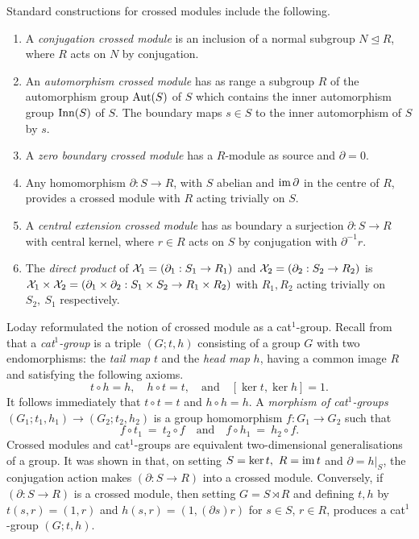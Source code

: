 \documentclass[a4paper,11pt]{article}
\theoremstyle{plain}
\theoremstyle{definition}
\begin{document}
Standard constructions for crossed modules include the following. 
\begin{enumerate}
\item 
A \emph{conjugation crossed module}  
is an inclusion of a normal subgroup $N \unlhd R$, 
where $R$ acts on $N$ by conjugation.
\item 
An \emph{automorphism crossed module}  
has as range a subgroup $R$ of the automorphism group $\mathrm{Aut}(S)$ of $S$ 
which contains the inner automorphism group $\mathrm{Inn}(S)$ of $S$. 
The boundary maps $s \in S$ to the inner automorphism of $S$ by $s$.
\item 
A \emph{zero boundary crossed module}  
has a $R$-module as source and $\partial = 0$.
\item 
Any homomorphism $\partial : S \to R$, with $S$ abelian 
and $\mathrm{im}\,\partial$ in the centre of $R$, 
provides a crossed module with $R$ acting trivially on $S$.
\item 
A \emph{central extension crossed module} 
has as boundary a surjection $\partial : S \to R$ with central kernel, 
where $r \in R$ acts on $S$ by conjugation with $\partial^{-1}r$.
\item 
The \emph{direct product} of  
$\mathcal{X}_1 = (\partial_1 : S_1 \to R_1)$ and $\mathcal{X}_2 = (\partial_2 : S_2 \to R_2)$ 
is $\mathcal{X}_1 \times \mathcal{X}_2 
= (\partial_1 \times \partial_2 : S_1 \times S_2 \to R_1 \times R_2)$ 
with $R_1, R_2$ acting trivially on $S_2,\ S_1$ respectively.
\end{enumerate}

Loday reformulated the notion of crossed module as a cat$^{1}$-group. 
Recall from \cite{Loday} that a \emph{cat$^{1}$-group} is a triple $(G;t,h)$ consisting of a group $G$ with two endomorphisms: 
the \emph{tail map} $t$ and the \emph{head map} $h$, 
having a common image $R$ and satisfying the following axioms. 
\begin{equation} \label{cat1-axioms} 
t \circ h = h, \quad  
h \circ t = t, 
\quad \mbox{and}\quad  [\ker t,\ker h] = 1. 
\end{equation} 
It follows immediately that $t \circ t = t$ and $h \circ h = h$. 
A \emph{morphism of cat}$^{1}$\emph{-groups} 
$(G_{1};t_1,h_1) \rightarrow (G_{2};t_2,h_2)$ 
is a group homomorphism $f : G_{1} \rightarrow G_{2}$ such that 
\[ 
f \circ t_1 ~=~ t_2 \circ f  
\quad\mbox{and}\quad 
f \circ h_1 ~=~ h_2 \circ f.
\] 
Crossed modules and cat$^{1}$-groups are equivalent two-dimensional 
generalisations of a group. 
It was shown in \cite[Lemma 2.2]{Loday} that, 
on setting $S = \ker t,~ R = \mathrm{im}\, t$ and $\partial = h|_{S}$, 
the conjugation action makes $(\partial : S \rightarrow R)$ 
into a crossed module. 
Conversely, if $(\partial : S \rightarrow R)$ is a crossed module, 
then setting $G = S \rtimes R$ and defining $t,h$ by $t(s,r) = (1,r)$ 
and $h(s,r) = (1,(\partial s)r)$ for $s \in S$, $r \in R$, 
produces a cat$^{1}$-group $(G;t,h)$.
\end{document}
